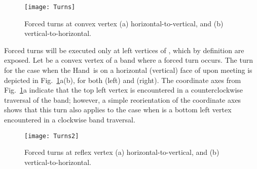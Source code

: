 \documentclass[11pt]{article}
\newcommand\hand{{\sc Hand}}
\begin{document}
\begin{figure}[htbp]
\centering
\texttt{[image: Turns]}
\caption{Forced turns at convex vertex  (a) horizontal-to-vertical, and  (b) vertical-to-horizontal.}
\label{fig:turns}
\end{figure}


Forced turns will be executed only at left vertices of , which by definition are exposed. Let  be a convex vertex of a band  where a forced turn occurs. The turn for the case when the \hand\ is on a horizontal (vertical) face of  upon meeting  is depicted in Fig.~\ref{fig:turns}a(b), for both  (left) and  (right). The coordinate axes from Fig.~\ref{fig:turns}a indicate that the top left vertex  is encountered in a counterclockwise traversal of the band; however, a simple reorientation of the coordinate axes shows that this turn also applies to the case when  is a  bottom left vertex encountered in a clockwise band traversal. 

\begin{figure}[htbp]
\centering
\texttt{[image: Turns2]}
\caption{Forced turns at reflex vertex  (a) horizontal-to-vertical, and  (b) vertical-to-horizontal.}
\label{fig:turns2}
\end{figure}
\end{document}
